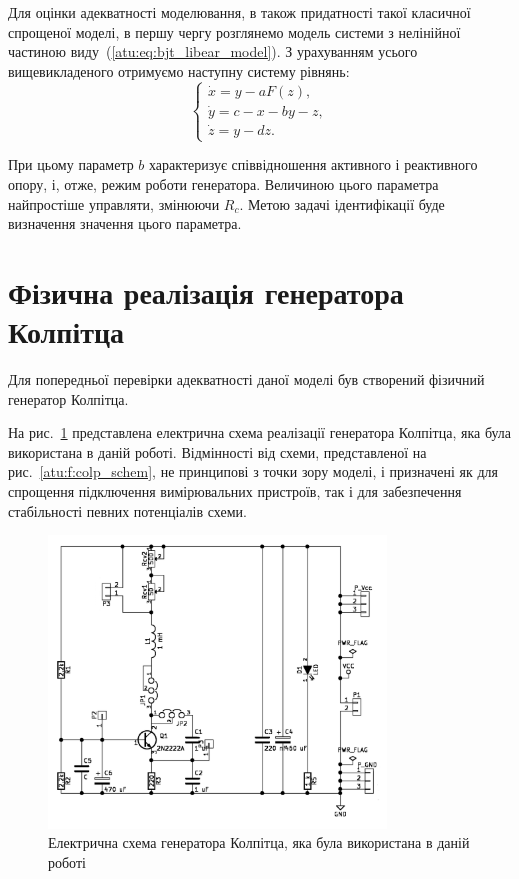 Для оцінки адекватності моделювання, в також придатності
такої класичної спрощеної моделі, в першу чергу розглянемо
модель системи з нелінійної частиною виду~(\ref{atu:eq:bjt_libear_model}). З
урахуванням усього вищевикладеного отримуємо наступну систему
рівнянь:
%
\begin{equation}
\label{atu:eq:colp}
\begin{cases}
  \dot{x} = y - a F(z), \\
  \dot{y} = c - x - by - z, \\
  \dot{z} = y - d z.
\end{cases}
\end{equation}

При цьому параметр
$ b $ характеризує співвідношення активного і реактивного опору,
і, отже, режим роботи генератора. Величиною цього параметра
найпростіше управляти, змінюючи
$ R_c $. Метою задачі ідентифікації буде визначення значення
цього параметра.




\section{Фізична реалізація генератора Колпітца} %

Для попередньої перевірки адекватності даної моделі був
створений фізичний генератор Колпітца.

На рис.~\ref{atu:f:colp_schem_real} представлена електрична схема
реалізації генератора Колпітца, яка була використана в даній
роботі. Відмінності від схеми, представленої на рис.~\ref{atu:f:colp_schem},
не принципові з точки зору моделі, і призначені як для спрощення
підключення вимірювальних пристроїв, так і для забезпечення
стабільності певних потенціалів схеми.

\begin{figure}[htb!]
\centerline{\includegraphics[width=0.8\textwidth]{p/colp_schem_real.png} }
\caption{Електрична схема генератора Колпітца, яка була використана в даній роботі}
\label{atu:f:colp_schem_real}
\end{figure}

